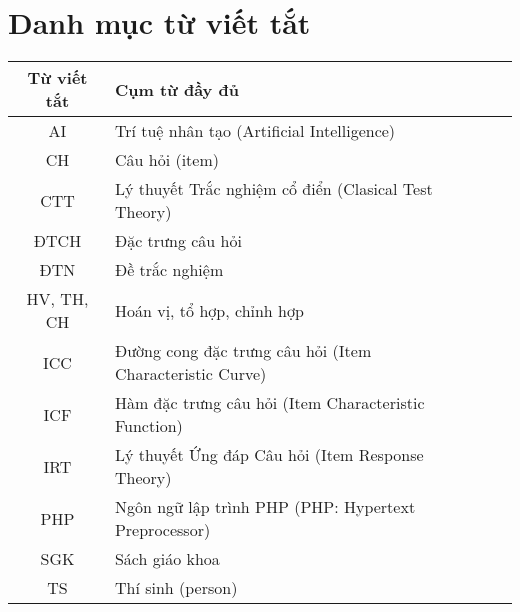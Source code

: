\chapter*{Danh mục từ viết tắt}
\begin{longtable}{SlSl}
	\textbf{Từ viết tắt} & \textbf{Cụm từ đầy đủ}\\ \hline
	AI & Trí tuệ nhân tạo (Artificial Intelligence)\\
	CH & Câu hỏi (item)\\
	CTT & Lý thuyết Trắc nghiệm cổ điển (Clasical Test Theory)\\
	ĐTCH & Đặc trưng câu hỏi\\
	ĐTN & Đề trắc nghiệm\\
	HV, TH, CH & Hoán vị, tổ hợp, chỉnh hợp\\
	ICC & Đường cong đặc trưng câu hỏi (Item Characteristic Curve)\\
	ICF & Hàm đặc trưng câu hỏi (Item Characteristic Function)\\
	IRT & Lý thuyết Ứng đáp Câu hỏi (Item Response Theory)\\
	PHP & Ngôn ngữ lập trình PHP (PHP: Hypertext Preprocessor)\\
	SGK & Sách giáo khoa\\
	TS & Thí sinh (person)\\
\end{longtable}
